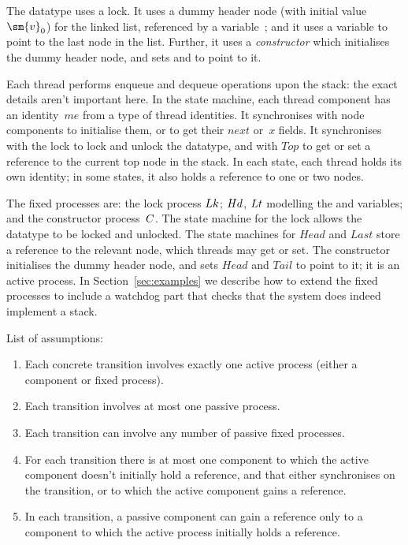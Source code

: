 The datatype uses a lock.  It uses a dummy header node (with initial
value~$\sm{v}_0$) for the linked list, referenced by a variable~;
and it uses a variable  to point to the last node in the list.
Further, it uses a \emph{constructor} which initialises the dummy header node,
and sets  and  to point to it.


Each thread performs enqueue and dequeue operations upon the stack: the
exact details aren't important here.  In the state machine, each thread
component has an identity~$me$ from a type of thread identities.  It
synchronises with node components to initialise them, or to get their $next$
or~$x$ fields.  It synchronises with the lock to lock and unlock the datatype,
and with $Top$ to get or set a reference to the current top node in the stack.
In each state, each thread holds its own identity; in some states, it also
holds a reference to one or two nodes.

The fixed processes are: the lock process $Lk$; $Hd$, $Lt$ modelling
the  and  variables; and the constructor
process~$C$.
The state machine for the lock allows the datatype to be locked and unlocked.
The state machines for $Head$ and $Last$ store a reference to the relevant
node, which threads may get or set.  The constructor initialises the dummy
header node, and sets $Head$ and $Tail$ to point to it; it is an active
process.  In Section~\ref{sec:examples} we describe how to extend the fixed
processes to include a watchdog part that checks that the system does indeed
implement a stack.

List of assumptions:
%
\begin{enumerate}
\item Each concrete transition involves exactly one active process (either a
component or fixed process).

\item Each transition involves at most one passive process.

\item Each transition can involve any number of passive fixed processes.

\item For each transition there is at most one component to which the
active component doesn't initially hold a reference, and that either
synchronises on the transition, or to which the active component gains a
reference.

\item\label{assump:secondary-cpts-new-refs}
In each transition, a passive component can gain a reference only to a
component to which the active process initially holds a reference.
\end{enumerate}
